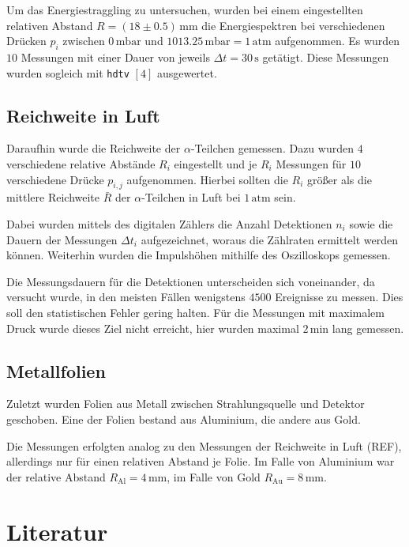 \documentclass[12pt,a4paper]{scrartcl}
\numberwithin{equation}{section} %
\renewcommand{\[}{} %
\renewcommand{\]}{\noindent} %
\begin{document}
Um das Energiestraggling zu untersuchen, wurden bei einem eingestellten
relativen Abstand \(R=(18\pm 0.5)\mathrm{\,mm}\) die Energiespektren bei
verschiedenen Drücken \(p_i\) zwischen \(0\mathrm{\,mbar}\) und
\(1013.25\mathrm{\,mbar}=1\mathrm{\,atm}\) aufgenommen. Es wurden \(10\)
Messungen mit einer Dauer von jeweils \(\Delta t=30\mathrm{\,s}\)
getätigt. Diese Messungen wurden sogleich mit \texttt{hdtv} \([4]\)
ausgewertet.

\hypertarget{reichweite-in-luft}{%
\subsection{Reichweite in Luft}\label{reichweite-in-luft}}

Daraufhin wurde die Reichweite der \(\alpha\)-Teilchen gemessen. Dazu
wurden \(4\) verschiedene relative Abstände \(R_i\) eingestellt und je
\(R_i\) Messungen für \(10\) verschiedene Drücke \(p_{i,j}\)
aufgenommen. Hierbei sollten die \(R_i\) größer als die mittlere
Reichweite \(\bar R\) der \(\alpha\)-Teilchen in Luft bei
\(1\mathrm{\,atm}\) sein.

Dabei wurden mittels des digitalen Zählers die Anzahl Detektionen
\(n_i\) sowie die Dauern der Messungen \(\Delta t_i\) aufgezeichnet,
woraus die Zählraten ermittelt werden können. Weiterhin wurden die
Impulshöhen mithilfe des Oszilloskops gemessen.

Die Messungsdauern für die Detektionen unterscheiden sich voneinander,
da versucht wurde, in den meisten Fällen wenigstens \(4500\) Ereignisse
zu messen. Dies soll den statistischen Fehler gering halten. Für die
Messungen mit maximalem Druck wurde dieses Ziel nicht erreicht, hier
wurden maximal \(2\mathrm{\,min}\) lang gemessen.

\hypertarget{metallfolien}{%
\subsection{Metallfolien}\label{metallfolien}}

Zuletzt wurden Folien aus Metall zwischen Strahlungsquelle und Detektor
geschoben. Eine der Folien bestand aus Aluminium, die andere aus Gold.

Die Messungen erfolgten analog zu den Messungen der Reichweite in Luft
(REF), allerdings nur für einen relativen Abstand je Folie. Im Falle von
Aluminium war der relative Abstand \(R_\mathrm{Al}=4\mathrm{\,mm}\), im
Falle von Gold \(R_\mathrm{Au}=8\mathrm{\,mm}\).

\hypertarget{literatur}{%
\section{Literatur}\label{literatur}}
\end{document}
